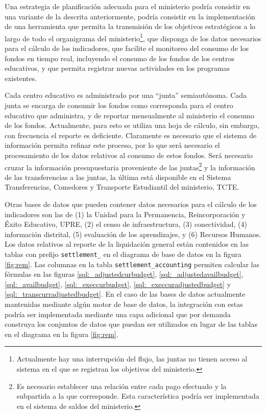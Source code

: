 \documentclass{article}
\begin{document}
\begin{multicols}{6}[]
Una estrategia de planificaci\'on adecuada para el ministerio podr\'ia consistir en una variante de la descrita anteriormente, podr\'ia consistir en la implementaci\'on de una herramienta que permita la transmisi\'on de los objetivos estrat\'egicos a lo largo de todo el organigrama del ministerio\footnote{Actualmente hay una interrupci\'on del flujo, las juntas no tienen acceso al sistema en el que se registran los objetivos del ministerio.}, que disponga de los datos necesarios para el c\'alculo de los indicadores, que facilite el monitoreo del consumo de los fondos en tiempo real, incluyendo el consumo de los fondos de los centros educativos, y que permita registrar nuevas actividades en los programas existentes.

Cada centro educativo es administrado por una ``junta'' semiaut\'onoma. Cada junta se encarga de consumir los fondos como corresponda para el centro educativo que administra, y de reportar mensualmente al ministerio el consumo de los fondos. Actualmente, para esto se utiliza una hoja de c\'alculo, sin embargo, con frecuencia el reporte es deficiente. Claramente es necesario que el sistema de informaci\'on permita refinar este proceso, por lo que ser\'a necesario el procesamiento de los datos relativos al consumo de estos fondos. Ser\'a necesario cruzar la informaci\'on presupuestaria proveniente de las juntas\footnote{Es necesario establecer una relaci\'on entre cada pago efectuado y la subpartida a la que corresponde. Esta caracter\'istica podr\'ia ser implementada en el sistema de saldos del ministerio.} y la informaci\'on de las transferencias a las juntas, la \'ultima est\'a disponible en el Sistema Transferencias, Comedores y Transporte Estudiantil del ministerio, TCTE.

Otras bases de datos que pueden contener datos necesarios para el c\'alculo de los indicadores son las de (1) la Unidad para la Permanencia, Reincorporaci\'on y \'Exito Educativo, UPRE, (2) el censo de infraestructura, (3) conectividad, (4) informaci\'on distrital, (5) evaluaci\'on de los aprendizajes, y (6) Recursos Humanos. Los datos relativos al reporte de la liquidaci\'on general est\'an contenidos en las tablas con prefijo \verb#settlement_# en el diagrama de base de datos en la figura \ref{fig:rem}. Las columnas en la tabla \verb#settlement_accounting# permiten calcular las f\'ormulas en las figuras \ref{sql:_adjustedcurbudget}, \ref{sql:_adjustedavailbudget}, \ref{sql:_availbudget}, \ref{sql:_execcurbudget}, \ref{sql:_execcuradjustedbudget} y \ref{sql:_transcurradjustedbudget}. En el caso de las bases de datos actualmente mantenidas mediante alg\'un motor de base de datos, la integraci\'on con estas podr\'ia ser implementada mediante una capa adicional que por demanda construya los conjuntos de datos que puedan ser utilizados en lugar de las tablas en el diagrama en la figura \ref{fig:rem}.


\end{multicols}
\end{document}
